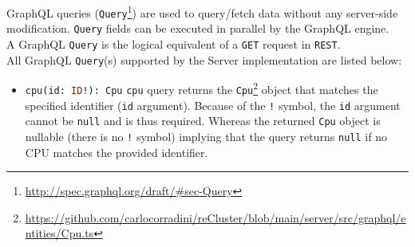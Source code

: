 GraphQL queries (\texttt{Query}\footnote{\url{http://spec.graphql.org/draft/\#sec-Query}})
are used to query/fetch data without any server-side modification. \texttt{Query}
fields can be executed in parallel by the GraphQL engine. \\ %
A GraphQL \texttt{Query} is the logical equivalent of a \texttt{GET} request in \texttt{REST}.
\\ %
All GraphQL \texttt{Query}(s) supported by the Server implementation are listed
below:

\begin{itemize}
  \item \lstinline[language=graphql, morekeywords={[2]{Cpu}}, morekeywords={[4]{id}},
    morekeywords={[5]{cpu}}]{cpu(id: ID!): Cpu}
    \newline
    \texttt{cpu} query returns the \texttt{Cpu}\footnote{\url{https://github.com/carlocorradini/reCluster/blob/main/server/src/graphql/entities/Cpu.ts}}
    object that matches the specified identifier (\texttt{id} argument).
    \newline
    Because of the \texttt{!} symbol, the \texttt{id} argument cannot be \texttt{null}
    and is thus required. Whereas the returned \texttt{Cpu} object is nullable (there
    is no \texttt{!} symbol) implying that the query returns \texttt{null} if no
    CPU matches the provided identifier.


\end{itemize}
